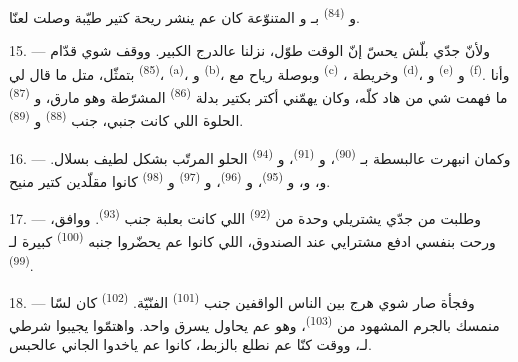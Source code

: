 و \textsuperscript{(84)} بـ و المتنوّعة كان عم ينشر ريحة كتير طيّبة وصلت
لعنّا.

\VUsaut{3.4mm}
\VUsaut{2.8mm}

15. --- ولأنّ جدّي بلّش يحسّ إنّ الوقت طوّل، نزلنا عالدرج الكبير.
ووقف شوي قدّام  \textsuperscript{(85)} بتمثّل، متل ما
قال لي،  \textsuperscript{(a)}، و \textsuperscript{(b)}، وبوصلة رياح مع  \textsuperscript{(c)} ،
وخريطة  \textsuperscript{(d)}، و
\textsuperscript{(e)} و \textsuperscript{(f)}.
وأنا ما فهمت شي من هاد كلّه، وكان يهمّني أكتر بكتير بدلة  \textsuperscript{(86)} المشرّطة وهو مارق، و
\textsuperscript{(87)} الحلوة اللي كانت جنبي، جنب 
\textsuperscript{(88)} و \textsuperscript{(89)}.

16. --- وكمان انبهرت عالبسطة بـ \textsuperscript{(90)}،
و \textsuperscript{(91)}، و \textsuperscript{(94)} الحلو المرتّب بشكل لطيف بسلال.
و، و، و
\textsuperscript{(95)}، و \textsuperscript{(96)}،
و \textsuperscript{(97)} و
\textsuperscript{(98)} كانوا مقلّدين كتير منيح.

\VUsaut{4.4mm}
\VUsaut{2.8mm}

17. --- وطلبت من جدّي يشتريلي وحدة من 
\textsuperscript{(92)} اللي كانت بعلبة جنب 
\textsuperscript{(93)}. ووافق، ورحت بنفسي ادفع مشترايي عند الصندوق،
اللي كانوا عم يحضّروا جنبه  \textsuperscript{(100)}
كبيرة لـ \textsuperscript{(99)}.

18. --- وفجأة صار شوي هرج بين الناس الواقفين جنب  \textsuperscript{(101)} الفنّيّة. 
\textsuperscript{(102)} كان لسّا منمسك بالجرم المشهود من 
\textsuperscript{(103)}، وهو عم يحاول يسرق واحد. واهتمّوا يجيبوا شرطي
لـ، ووقت كنّا عم نطلع بالزبط، كانوا عم ياخدوا الجاني
عالحبس.
